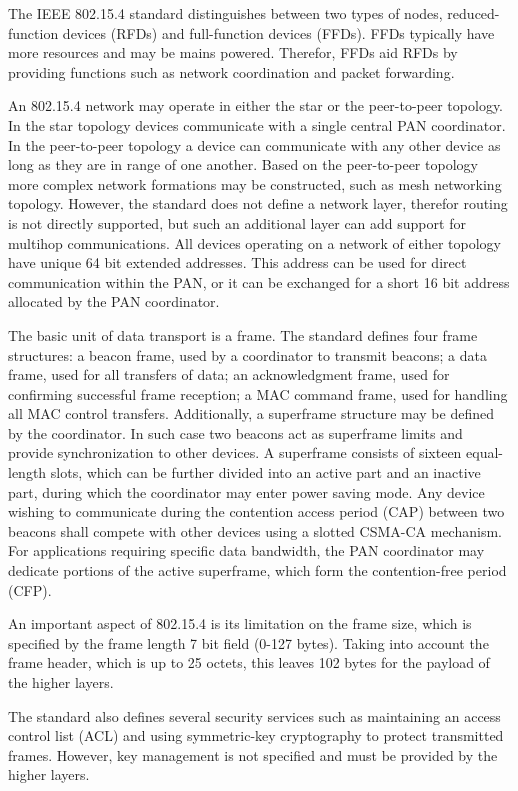 \documentclass[12pt, titlepage, a4paper]{report}
\begin{document}
The IEEE 802.15.4 standard distinguishes between two types of nodes, reduced-function devices (RFDs) and full-function devices (FFDs).                                   FFDs typically have more resources and may be mains powered.  Therefor, FFDs aid RFDs by providing functions such as network coordination and packet forwarding.

An 802.15.4 network may operate in either the star or the peer-to-peer topology. In the star topology devices communicate with a single central PAN coordinator. In the peer-to-peer topology a device can communicate with any other device as long as they are in range of one another. Based on the peer-to-peer topology more complex network formations may be constructed, such as mesh networking topology. However, the standard does not define a network layer, therefor routing is not directly supported, but such an additional layer can add support for multihop communications. All devices operating on a network of either topology have unique 64 bit extended addresses. This address can be used for direct communication within the PAN, or it can be exchanged for a short 16 bit address allocated by the PAN coordinator.

The basic unit of data transport is a frame. The standard defines four frame structures: a beacon frame, used by a coordinator to transmit beacons;
a data frame, used for all transfers of data; an acknowledgment frame, used for confirming successful frame reception; a MAC command frame, used for handling all MAC control transfers. Additionally, a superframe structure may be defined by the coordinator. In such case two beacons act as superframe limits and provide synchronization to other devices. A superframe consists of sixteen equal-length slots, which can be further divided into an active part and an inactive part, during which the coordinator may enter power saving mode. Any device wishing to communicate during the contention access period (CAP) between two beacons shall compete with other devices using a slotted CSMA-CA mechanism. For applications requiring specific data bandwidth, the PAN coordinator may dedicate portions of the active superframe, which form the contention-free period (CFP).

An important aspect of 802.15.4 is its limitation on the frame size, which is specified by the frame length 7 bit field (0-127 bytes). Taking into account the frame header, which is up to 25 octets, this leaves 102 bytes for the payload of the higher layers.

The standard also defines several security services such as maintaining an access control list (ACL) and
using symmetric-key cryptography to protect transmitted frames. However, key management is not specified and must be provided by the higher layers. 
\end{document}
